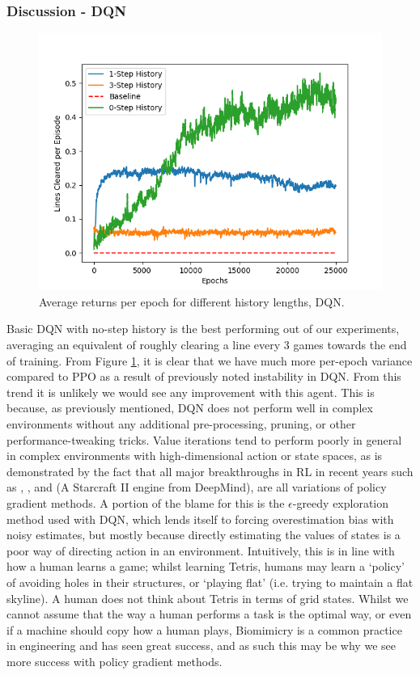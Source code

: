\documentclass[12pt]{article}
\begin{document}
\subsubsection{Discussion - DQN}\label{dqndiss}
\begin{figure}[H]
    \centering
    \includegraphics[scale=0.7]{28.png}
    \caption{Average returns per epoch for different history lengths, DQN.}
    \label{dqnstate}
\end{figure}
Basic DQN with no-step history is the best performing out of our experiments, averaging an equivalent of roughly clearing a line every 3 games towards the end of training. From Figure \ref{dqnstate}, it is clear that we have much more per-epoch variance compared to PPO as a result of previously noted instability in DQN. From this trend it is unlikely we would see any improvement with this agent. This is because, as previously mentioned, DQN does not perform well in complex environments without any additional pre-processing, pruning, or other performance-tweaking tricks. Value iterations tend to perform poorly in general in complex environments with high-dimensional action or state spaces, as is demonstrated by the fact that all major breakthroughs in RL in recent years such as \textcite{MuZero}, \textcite{DBLP:journals/corr/abs-1912-06680}, and \textcite{Vinyals2019} (A Starcraft II engine from DeepMind), are all variations of policy gradient methods. A portion of the blame for this is the $\epsilon$-greedy exploration method used with DQN, which lends itself to forcing overestimation bias with noisy estimates, but mostly because directly estimating the values of states is a poor way of directing action in an environment. Intuitively, this is in line with how a human learns a game; whilst learning Tetris, humans may learn a `policy' of avoiding holes in their structures, or `playing flat' (i.e. trying to maintain a flat skyline). A human does not think about Tetris in terms of grid states. Whilst we cannot assume that the way a human performs a task is the optimal way, or even if a machine should copy how a human plays, Biomimicry is a common practice in engineering and has seen great success, and as such this may be why we see more success with policy gradient methods. \\\newline
\end{document}
